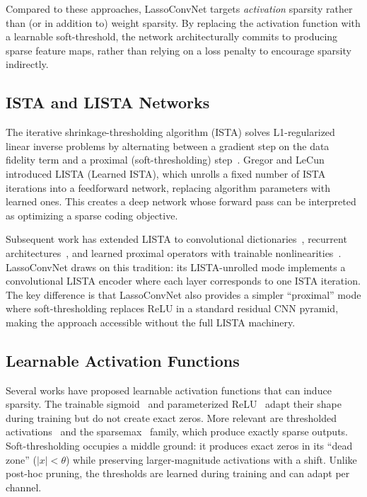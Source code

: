 \documentclass{article}
\begin{document}
Compared to these approaches, LassoConvNet targets \emph{activation} sparsity
rather than (or in addition to) weight sparsity. By replacing the activation
function with a learnable soft-threshold, the network architecturally commits
to producing sparse feature maps, rather than relying on a loss penalty to
encourage sparsity indirectly.

\subsection{ISTA and LISTA Networks}

The iterative shrinkage-thresholding algorithm (ISTA) solves L1-regularized
linear inverse problems by alternating between a gradient step on the data
fidelity term and a proximal (soft-thresholding) step~\cite{beck2009fast}.
Gregor and LeCun~\cite{gregor2010learning} introduced LISTA (Learned ISTA),
which unrolls a fixed number of ISTA iterations into a feedforward network,
replacing algorithm parameters with learned ones. This creates a deep network
whose forward pass can be interpreted as optimizing a sparse coding objective.

Subsequent work has extended LISTA to convolutional
dictionaries~\cite{zhang2018ista}, recurrent architectures~\cite{wisdom2016},
and learned proximal operators with trainable nonlinearities~\cite{sprechmann2015}.
LassoConvNet draws on this tradition: its LISTA-unrolled mode implements a
convolutional LISTA encoder where each layer corresponds to one ISTA iteration.
The key difference is that LassoConvNet also provides a simpler ``proximal''
mode where soft-thresholding replaces ReLU in a standard residual CNN pyramid,
making the approach accessible without the full LISTA machinery.

\subsection{Learnable Activation Functions}

Several works have proposed learnable activation functions that can induce
sparsity. The trainable sigmoid~\cite{chen2019self} and
parameterized ReLU~\cite{he2015delving} adapt their shape during training but
do not create exact zeros. More relevant are thresholded
activations~\cite{konda2015zero} and the
sparsemax~\cite{martins2016softmax} family, which produce exactly sparse
outputs. Soft-thresholding occupies a middle ground: it produces exact zeros
in its ``dead zone'' ($|x| < \theta$) while preserving larger-magnitude
activations with a shift. Unlike post-hoc pruning, the thresholds are learned
during training and can adapt per channel.
\end{document}
